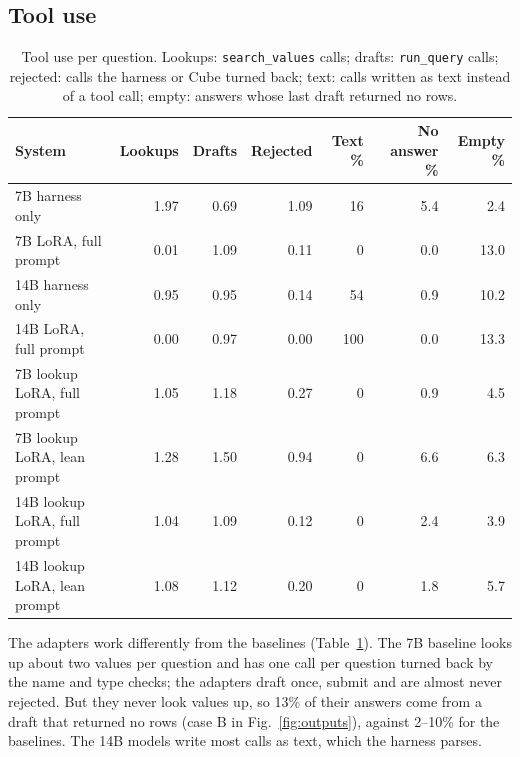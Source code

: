\subsection{Tool use}\label{sec:tooluse}
\begin{table}[!htbp]
\centering
\footnotesize
\caption{Tool use per question. Lookups: \texttt{search\_values} calls; drafts: \texttt{run\_query} calls; rejected: calls the harness or Cube turned back; text: calls written as text instead of a tool call; empty: answers whose last draft returned no rows.}
\label{tab:tools}
\begin{tabularx}{\linewidth}{@{}Xrrrrrr@{}}
\toprule
\textbf{System} & \textbf{Lookups} & \textbf{Drafts} & \textbf{Rejected} & \textbf{Text \%} & \textbf{No answer \%} & \textbf{Empty \%}\\
\midrule
7B harness only & 1.97 & 0.69 & 1.09 & 16 & 5.4 & 2.4\\
7B LoRA, full prompt & 0.01 & 1.09 & 0.11 & 0 & 0.0 & 13.0\\
14B harness only & 0.95 & 0.95 & 0.14 & 54 & 0.9 & 10.2\\
14B LoRA, full prompt & 0.00 & 0.97 & 0.00 & 100 & 0.0 & 13.3\\
\midrule
7B lookup LoRA, full prompt & 1.05 & 1.18 & 0.27 & 0 & 0.9 & 4.5\\
7B lookup LoRA, lean prompt & 1.28 & 1.50 & 0.94 & 0 & 6.6 & 6.3\\
14B lookup LoRA, full prompt & 1.04 & 1.09 & 0.12 & 0 & 2.4 & 3.9\\
14B lookup LoRA, lean prompt & 1.08 & 1.12 & 0.20 & 0 & 1.8 & 5.7\\
\bottomrule
\end{tabularx}
\end{table}

The adapters work differently from the baselines (Table~\ref{tab:tools}). The 7B baseline looks up about two values per question and has one call per question turned back by the name and type checks; the adapters draft once, submit and are almost never rejected. But they never look values up, so 13\% of their answers come from a draft that returned no rows (case B in Fig.~\ref{fig:outputs}), against 2--10\% for the baselines. The 14B models write most calls as text, which the harness parses.

